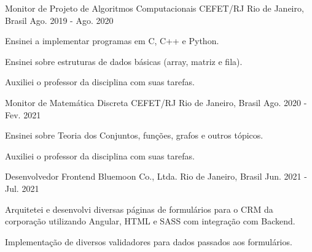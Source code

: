 

\begin{cventries}

  \cventry
    {Monitor de Projeto de Algoritmos Computacionais} %
    {CEFET/RJ} %
    {Rio de Janeiro, Brasil} %
    {Ago. 2019 - Ago. 2020} %
    {
      \begin{cvitems} %
        \item {Ensinei a implementar programas em C, C++ e Python.}
        \item {Ensinei sobre estruturas de dados básicas (array, matriz e fila).}
        \item {Auxiliei o professor da disciplina com suas tarefas.}
      \end{cvitems}
    }

  \cventry
    {Monitor de Matemática Discreta} %
    {CEFET/RJ} %
    {Rio de Janeiro, Brasil} %
    {Ago. 2020 - Fev. 2021} %
    {
      \begin{cvitems} %
        \item {Ensinei sobre Teoria dos Conjuntos, funções, grafos e outros tópicos.}
        \item {Auxiliei o professor da disciplina com suas tarefas.}
      \end{cvitems}
    }

  \cventry
    {Desenvolvedor Frontend} %
    {Bluemoon Co., Ltda.} %
    {Rio de Janeiro, Brasil} %
    {Jun. 2021 - Jul. 2021} %
    {
      \begin{cvitems} %
        \item {Arquitetei e desenvolvi diversas páginas de formulários para o CRM da corporação utilizando Angular, HTML e SASS com integração com Backend.}
        \item {Implementação de diversos validadores para dados passados aos formulários.}
      \end{cvitems}
    }


\end{cventries}

